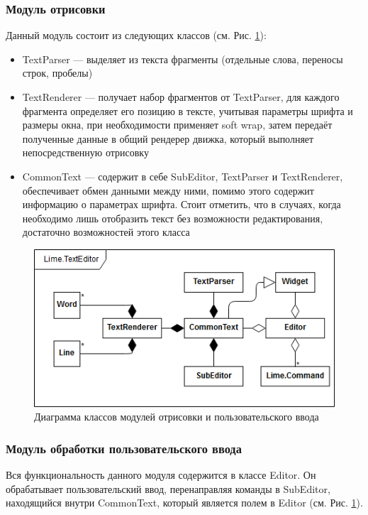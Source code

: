 \documentclass{fefu}
\begin{document}
			\subsubsection{Модуль отрисовки}
				\par Данный модуль состоит из следующих классов (см. Рис. 
				\ref{diag:RendererScheme}):
				\begin{itemize}
					\item TextParser --- выделяет из текста фрагменты (отдельные слова, 
					переносы строк, пробелы)
					\item TextRenderer --- получает набор фрагментов от TextParser, для каждого
					фрагмента определяет его позицию в тексте, учитывая параметры шрифта и 
					размеры окна, при необходимости применяет soft wrap, затем передаёт
					полученные данные в общий рендерер движка, который выполняет
					непосредственную отрисовку
					\item CommonText --- содержит в себе SubEditor, TextParser и TextRenderer,
					обеспечивает обмен данными между ними, помимо этого содержит информацию о
					параметрах шрифта. Стоит отметить, что в случаях, когда необходимо лишь 
					отобразить текст без возможности редактирования, достаточно возможностей
					этого класса
				\end{itemize}
				\begin{figure}[h]
					\centering
					\includegraphics[width=1\linewidth]{diagrams/EditorScheme.png}
					\caption{Диаграмма классов модулей отрисовки и пользовательского
					ввода}
					\label{diag:RendererScheme}
				\end{figure}
			\subsubsection{Модуль обработки пользовательского ввода}
				\par Вся функциональность данного модуля содержится в классе Editor. Он
				обрабатывает пользовательский ввод, перенаправляя команды в SubEditor,
				находящийся внутри CommonText, который является полем в Editor (см. Рис. 
				\ref{diag:RendererScheme}).
\end{document}
